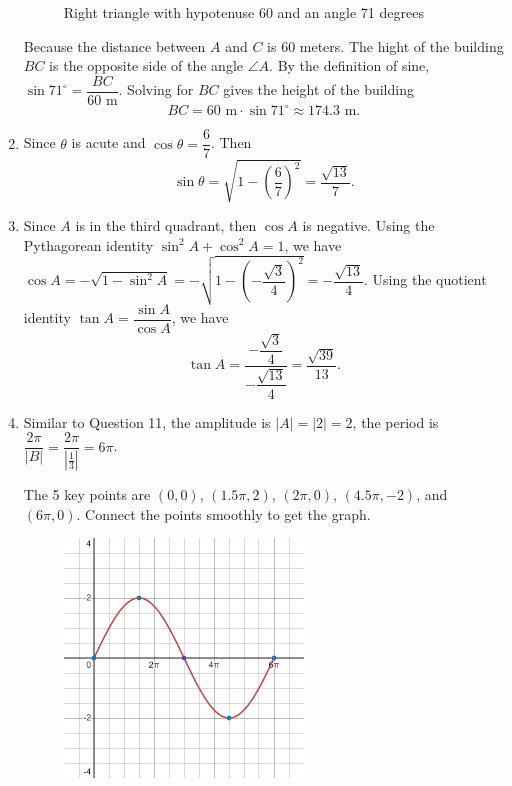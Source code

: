 \documentclass[
  12pt]{article}
\begin{document}
\begin{enumerate}
\begin{figure}[H]
{  }

  \caption{Right triangle with hypotenuse 60 and an angle 71 degrees}

  \end{figure}%

  Because the distance between \(A\) and \(C\) is 60 meters. The hight
  of the building \(BC\) is the opposite side of the angle \(\angle A\).
  By the definition of sine,
  \(\sin 71^\circ = \dfrac{BC}{60 \text{ m}}\). Solving for \(BC\) gives
  the height of the building
  \[BC = 60 \text{ m} \cdot \sin 71^\circ \approx 174.3 \text{ m}.\]
\item
  Since \(\theta\) is acute and \(\cos\theta = \dfrac67\). Then
  \[\sin\theta=\sqrt{1-\left(\dfrac67\right)^2} = \dfrac{\sqrt{13}}{7}.\]
\item
  Since \(A\) is in the third quadrant, then \(\cos A\) is negative.
  Using the Pythagorean identity \(\sin^2A + \cos^2A = 1\), we have
  \(\cos A = -\sqrt{1-\sin^2A} = -\sqrt{1-\left(-\dfrac{\sqrt{3}}{4}\right)^2} = -\dfrac{\sqrt{13}}{4}\).
  Using the quotient identity \(\tan A = \dfrac{\sin A}{\cos A}\), we
  have
  \[\tan A = \dfrac{-\dfrac{\sqrt{3}}{4}}{-\dfrac{\sqrt{13}}{4}} = \dfrac{\sqrt{39}}{13}.\]
\item
  Similar to Question 11, the amplitude is \(|A|=|2|=2\), the period is
  \(\dfrac{2\pi}{|B|}=\dfrac{2\pi}{|\frac{1}{3}|}=6\pi\).

  The 5 key points are \((0, 0)\), \((1.5\pi, 2)\), \((2\pi, 0)\),
  \((4.5\pi, -2)\), and \((6\pi, 0)\). Connect the points smoothly to
  get the graph.

  \begin{figure}[H]

  {\centering \includegraphics[width=0.6\textwidth,height=\textheight]{Q19.png}

}
\end{figure}
\end{enumerate}
\end{document}

